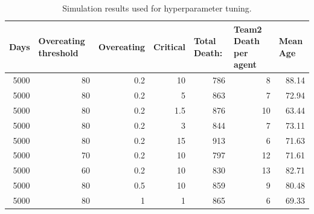 \begin{table}[]
\begin{adjustbox}{width=\columnwidth,center}
\begin{tabular}{@{}rrrrrrr@{}}
\toprule
\multicolumn{1}{l}{Days} & \multicolumn{1}{l}{Overeating threshold} & \multicolumn{1}{l}{Overeating} & \multicolumn{1}{l}{Critical} & \multicolumn{1}{l}{Total Death:} & \multicolumn{1}{l}{Team2 Death per agent} & \multicolumn{1}{l}{Mean Age} \\ \midrule
5000                     & 80                                       & 0.2                            & 10                           & 786                              & 8                                         & 88.14                        \\
5000                     & 80                                       & 0.2                            & 5                            & 863                              & 7                                         & 72.94                        \\
5000                     & 80                                       & 0.2                            & 1.5                          & 876                              & 10                                        & 63.44                        \\
5000                     & 80                                       & 0.2                            & 3                            & 844                              & 7                                         & 73.11                        \\
5000                     & 80                                       & 0.2                            & 15                           & 913                              & 6                                         & 71.63                        \\
5000                     & 70                                       & 0.2                            & 10                           & 797                              & 12                                        & 71.61                        \\
5000                     & 60                                       & 0.2                            & 10                           & 830                              & 13                                        & 82.71                        \\
5000                     & 80                                       & 0.5                            & 10                           & 859                              & 9                                         & 80.48                        \\
5000                     & 80                                       & 1                              & 1                            & 865                              & 6                                         & 69.33                        \\ \bottomrule
\end{tabular}
\end{adjustbox}
\caption{Simulation results used for hyperparameter tuning.}
\label{hyperparam-tab}
\end{table}

